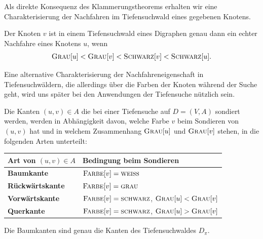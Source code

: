 \begin{bem}
Als direkte Konsequenz des Klammerungstheorems erhalten wir eine Charakterisierung der Nachfahren im Tiefensuchwald eines gegebenen Knotens.
\end{bem} 

\begin{kor}
\label{cor:nachfahre-tiefenwald}
Der Knoten $v$ ist in einem Tiefensuchwald eines Digraphen genau dann ein echter Nachfahre eines Knotens $u$, wenn
\[
\mathop{\text{\textsc{Grau}}}[u] < \mathop{\text{\textsc{Grau}}}[v] < \mathop{\text{\textsc{Schwarz}}}[v]  < \mathop{\text{\textsc{Schwarz}}}[u].
\]
\end{kor}

\begin{bem} 
Eine alternative Charakterisierung der Nachfahreneigenschaft in Tiefensuchwäldern, die allerdings über die Farben der Knoten während der Suche geht, wird uns später bei den Anwendungen der Tiefensuche nützlich sein. 
\end{bem}


\begin{defn}
\label{def:kantenarten-tiefensuche}
Die Kanten $(u,v) \in A$ die bei einer Tiefensuche auf $D=(V,A)$ sondiert werden, werden in Abhängigkeit davon, welche Farbe $v$ beim Sondieren von $(u,v)$ hat und in welchem Zusammenhang $\mathop{\text{\textsc{Grau}}}[u]$  und $\mathop{\text{\textsc{Grau}}}[v]$ stehen, in die folgenden Arten unterteilt: 
\begin{center} 
\begin{tabular}{l|l}
	Art von $(u,v) \in A$ & Bedingung beim Sondieren 
	\\ \hline 
	\textbf{Baumkante} & $\mathop{\text{\textsc{Farbe}}}[v]=\mathop{\text{\textsc{weiss}}}$ 
\\	\textbf{Rückwärtskante} & $\mathop{\text{\textsc{Farbe}}}[v] = \mathop{\text{\textsc{grau}}}$
\\ \textbf{Vorwärtskante} & $\mathop{\text{\textsc{Farbe}}}[v] = \mathop{\text{\textsc{schwarz}}}$, $\mathop{\text{\textsc{Grau}}}[u] < \mathop{\text{\textsc{Grau}}}[v]$
\\ \textbf{Querkante} & $\mathop{\text{\textsc{Farbe}}}[v] = \mathop{\text{\textsc{schwarz}}}$, $\mathop{\text{\textsc{Grau}}}[u] > \mathop{\text{\textsc{Grau}}}[v]$
\end{tabular} 
\end{center} 
Die Baumkanten sind genau die Kanten des Tiefensuchwaldes $D_\pi$. 
\end{defn}

